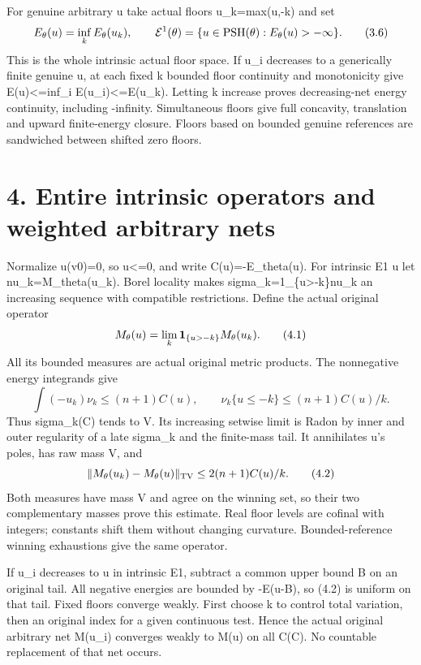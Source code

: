 \documentclass[
  10pt,
]{article}
\begin{document}
For genuine arbitrary u take actual floors u\_k=max(u,-k) and set \[
 E_\theta(u)=\inf_kE_\theta(u_k),\qquad
 {\cal E}^1(\theta)=\{u\in{\rm PSH}(\theta):E_\theta(u)>-\infty\}.          \tag{3.6}
\] This is the whole intrinsic actual floor space. If u\_i decreases to
a generically finite genuine u, at each fixed k bounded floor continuity
and monotonicity give E(u)\textless=inf\_i E(u\_i)\textless=E(u\_k).
Letting k increase proves decreasing-net energy continuity, including
-infinity. Simultaneous floors give full concavity, translation and
upward finite-energy closure. Floors based on bounded genuine references
are sandwiched between shifted zero floors.

\section{4. Entire intrinsic operators and weighted arbitrary
nets}\label{entire-intrinsic-operators-and-weighted-arbitrary-nets}

Normalize u(v0)=0, so u\textless=0, and write C(u)=-E\_theta(u). For
intrinsic E1 u let nu\_k=M\_theta(u\_k). Borel locality makes
sigma\_k=1\_\{u\textgreater-k\}nu\_k an increasing sequence with
compatible restrictions. Define the actual original operator \[
 M_\theta(u)=\lim_k{\bf1}_{\{u>-k\}}M_\theta(u_k).                         \tag{4.1}
\] All its bounded measures are actual original metric products. The
nonnegative energy integrands give \[
 \int(-u_k)\nu_k\le(n+1)C(u),\qquad \nu_k\{u\le-k\}\le(n+1)C(u)/k.
\] Thus sigma\_k(C) tends to V. Its increasing setwise limit is Radon by
inner and outer regularity of a late sigma\_k and the finite-mass tail.
It annihilates u's poles, has raw mass V, and \[
 \|M_\theta(u_k)-M_\theta(u)\|_{\rm TV}\le2(n+1)C(u)/k.                   \tag{4.2}
\] Both measures have mass V and agree on the winning set, so their two
complementary masses prove this estimate. Real floor levels are cofinal
with integers; constants shift them without changing curvature.
Bounded-reference winning exhaustions give the same operator.

If u\_i decreases to u in intrinsic E1, subtract a common upper bound B
on an original tail. All negative energies are bounded by -E(u-B), so
(4.2) is uniform on that tail. Fixed floors converge weakly. First
choose k to control total variation, then an original index for a given
continuous test. Hence the actual original arbitrary net M(u\_i)
converges weakly to M(u) on all C(C). No countable replacement of that
net occurs.
\end{document}
